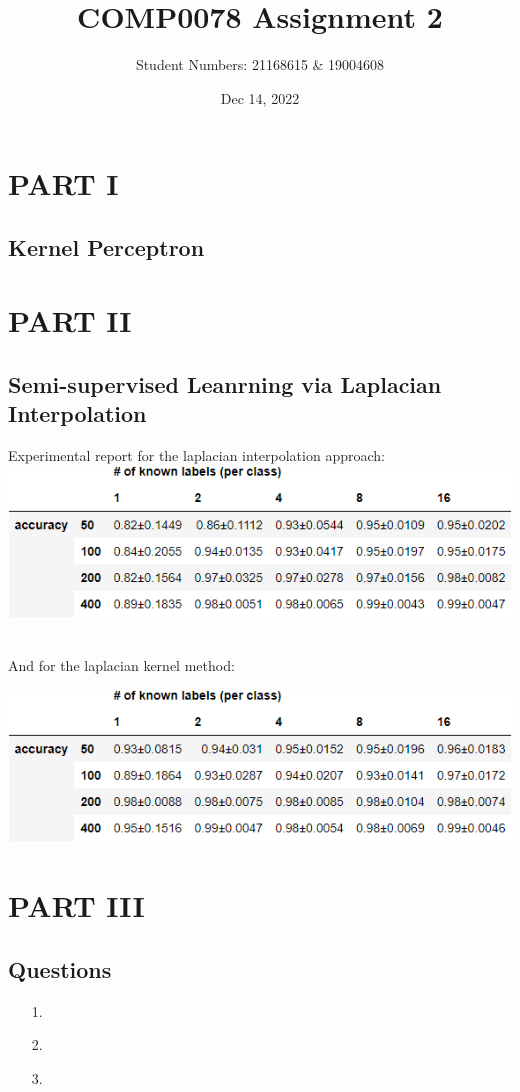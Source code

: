\documentclass[12pt]{article}
\title{\textbf{COMP0078 Assignment 2}}
\author{Student Numbers: 21168615 \& 19004608 \\ }
\date{Dec 14, 2022}
\begin{document}
    \maketitle
\section{PART I}
\subsection{Kernel Perceptron}
\newpage
\section{PART II}
\subsection{Semi-supervised Leanrning via Laplacian Interpolation}
Experimental report for the laplacian interpolation approach:
\\

\includegraphics{outputs/part2/laplacian_interpolation_report.png}

\\

And for the laplacian kernel method:

\includegraphics{outputs/part2/laplacian_kernel_interpolation_report.png}



\newpage



\section{PART III}
\subsection{Questions}
\begin{itemize}
    \item[1.]
    \item[2.]
    \item[3.]
\end{itemize}
\end{document}
